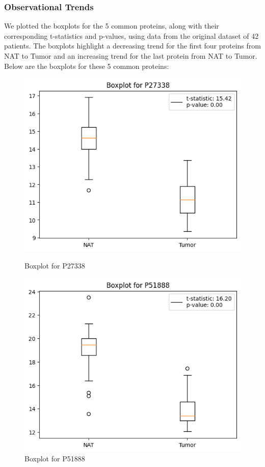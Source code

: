 \documentclass[a4paper,12pt]{article}
\begin{document}
\subsubsection{Observational Trends}
We plotted the boxplots for the 5 common proteins, along with their corresponding t-statistics and p-values, using data from the original dataset of 42 patients. The boxplots highlight a decreasing trend for the first four proteins from NAT to Tumor and an increasing trend for the last protein from NAT to Tumor. Below are the boxplots for these 5 common proteins:

\begin{figure}[H]
	\centering
	\begin{minipage}[b]{0.32\textwidth}
		\centering
		\includegraphics[width=\textwidth]{images/1.png}
		\caption{Boxplot for P27338}
		\label{fig:boxplot_Q03692}
	\end{minipage}
	\hfill
	\begin{minipage}[b]{0.32\textwidth}
		\centering
		\includegraphics[width=\textwidth]{images/2.png}
		\caption{Boxplot for P51888}


\end{minipage}
\end{figure}
\end{document}

